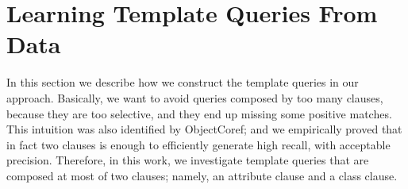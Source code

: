 \section{Learning Template Queries From Data}


In this section we describe how we construct the template queries in our approach. Basically, we want to avoid queries composed by too many clauses, because they are too selective, and they end up missing some positive matches. This intuition was also identified by ObjectCoref\cite{DBLP:conf/www/HuCQ11}; and we empirically proved that in fact two clauses is enough to efficiently generate high recall, with acceptable precision. Therefore, in this work, we investigate template queries that are composed at most of two clauses; namely, an attribute clause and a class clause. 


